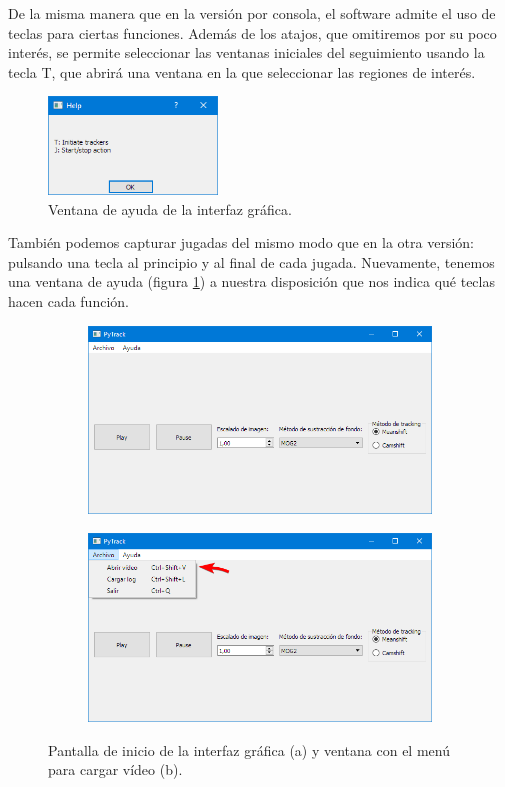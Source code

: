De la misma manera que en la versión por consola, el software admite el uso de teclas para ciertas funciones. Además de los atajos, que omitiremos por su poco interés, se permite seleccionar las ventanas iniciales del seguimiento usando la tecla T, que abrirá una ventana en la que seleccionar las regiones de interés.

\begin{figure}
    \centering
    \includegraphics[width=0.4\textwidth]{images/help2}
    \caption{Ventana de ayuda de la interfaz gráfica.}
    \label{fig:help}
\end{figure}

También podemos capturar jugadas del mismo modo que en la otra versión: pulsando una tecla al principio y al final de cada jugada. Nuevamente, tenemos una ventana de ayuda (figura \ref{fig:help}) a nuestra disposición que nos indica qué teclas hacen cada función.

\begin{figure}
\begin{subfigure}{.5\textwidth}
  \centering
  \includegraphics[width=.9\linewidth]{images/ventanagrafica}
  \caption { }
  \label{fig:graficaA}
\end{subfigure}%
\begin{subfigure}{.5\textwidth}
  \centering
  \includegraphics[width=.9\linewidth]{images/ventanacargar}
  \caption { }
  \label{fig:graficaB}
\end{subfigure}
\caption{Pantalla de inicio de la interfaz gráfica (a) y ventana con el menú para cargar vídeo (b).}
\label{fig:grafica}
\end{figure}

